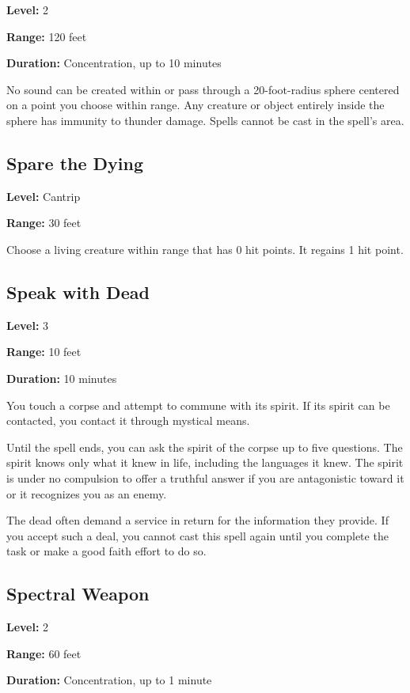 \documentclass[12pt,letterpaper,twocolumn,openany,nodeprecatedcode,bg=none]{dndbook}
\let\oldsubsection\subsection
\renewcommand{\subsection}[1]{%
  \needspace{5\baselineskip}%
  \oldsubsection{#1}%
}
\begin{document}
\textbf{Level:} 2

\textbf{Range:} 120 feet

\textbf{Duration:} Concentration, up to 10 minutes

No sound can be created within or pass through a 20-foot-radius sphere
centered on a point you choose within range. Any creature or object
entirely inside the sphere has immunity to thunder damage. Spells cannot
be cast in the spell's area.

\subsection{Spare the Dying}\label{spare-the-dying}

\textbf{Level:} Cantrip

\textbf{Range:} 30 feet

Choose a living creature within range that has 0 hit points. It regains
1 hit point.

\subsection{Speak with Dead}\label{speak-with-dead}

\textbf{Level:} 3

\textbf{Range:} 10 feet

\textbf{Duration:} 10 minutes

You touch a corpse and attempt to commune with its spirit. If its spirit
can be contacted, you contact it through mystical means.

Until the spell ends, you can ask the spirit of the corpse up to five
questions. The spirit knows only what it knew in life, including the
languages it knew. The spirit is under no compulsion to offer a truthful
answer if you are antagonistic toward it or it recognizes you as an
enemy.

The dead often demand a service in return for the information they
provide. If you accept such a deal, you cannot cast this spell again
until you complete the task or make a good faith effort to do so.

\subsection{Spectral Weapon}\label{spectral-weapon}

\textbf{Level:} 2

\textbf{Range:} 60 feet

\textbf{Duration:} Concentration, up to 1 minute
\end{document}
